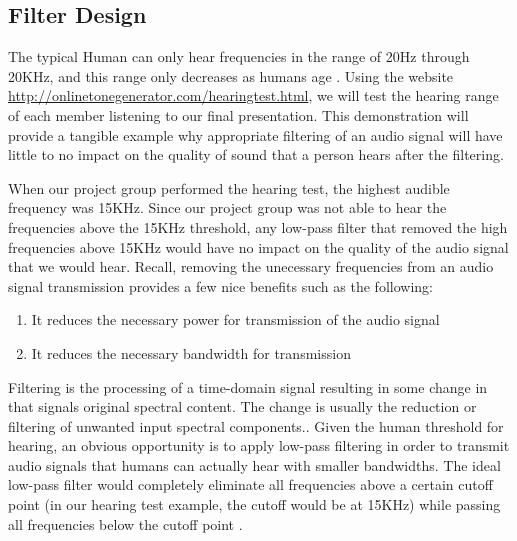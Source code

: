 \subsection{Filter Design}

The typical Human can only hear frequencies in the range of 20Hz through 20KHz, and this range only decreases as humans age  \cite{human:rg}.  Using the website \url{http://onlinetonegenerator.com/hearingtest.html}, we will test the hearing range of each member listening to our final presentation.  This demonstration will provide a tangible example why appropriate filtering of an audio signal will have little to no impact on the quality of sound that a person hears after the filtering.  

When our project group performed the hearing test, the highest audible frequency was 15KHz.  Since our project group was not able to hear the frequencies above the 15KHz threshold, any low-pass filter that removed the high frequencies above 15KHz would have no impact on the quality of the audio signal that  we would hear.  Recall, removing the unecessary frequencies from an audio signal transmission provides a few nice benefits such as the following: 

\begin{enumerate}
\item It reduces the necessary power for transmission of the audio signal
\item It reduces the necessary bandwidth for transmission
\end{enumerate}

Filtering is the processing of a time-domain signal resulting in some change in that signals original spectral content.  The change is usually the reduction or filtering of unwanted input spectral components.\cite{lyons:intro}.  Given the human threshold for hearing, an obvious opportunity is to apply low-pass filtering in order to transmit audio signals that humans can actually hear with smaller bandwidths.  The ideal low-pass filter would completely eliminate all frequencies above a certain cutoff point (in our hearing test example, the cutoff would be at 15KHz) while passing all frequencies below the cutoff point \cite{lowpass:wiki}.       

